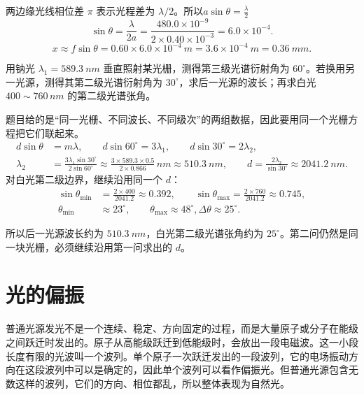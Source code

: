 \documentclass[lang=cn,11pt]{elegantbook}
\begin{document}
\begin{solution}
两边缘光线相位差 \(\pi\) 表示光程差为 \(\lambda/2\)。所以$a\sin\theta=\frac{\lambda}{2}$
\[\sin\theta=\frac{\lambda}{2a} =\frac{480.0\times10^{-9}}{2\times0.40\times10^{-3}} =6.0\times10^{-4}.\]
 \[x\approx f\sin\theta =0.60\times6.0\times10^{-4}\ \si{m} =3.6\times10^{-4}\ \si{m} =\SI{0.36}{mm}.\]
\end{solution}

\begin{exercise}[钠光与另一光源在同一光栅上怎样比较波长]
用钠光 \(\lambda_1=\SI{589.3}{nm}\) 垂直照射某光栅，测得第三级光谱衍射角为 \(60^\circ\)。若换用另一光源，测得其第二级光谱衍射角为 \(30^\circ\)，求后一光源的波长；再求白光 \(400\sim760\,\si{nm}\) 的第二级光谱张角。
\end{exercise}

\begin{solution}
题目给的是“同一光栅、不同波长、不同级次”的两组数据，因此要用同一个光栅方程把它们联起来。
\[
\begin{aligned}
d\sin\theta&=m\lambda,\qquad
d\sin60^\circ=3\lambda_1,\qquad
d\sin30^\circ=2\lambda_2,\\
\lambda_2&=\frac{3\lambda_1\sin30^\circ}{2\sin60^\circ}
\approx \frac{3\times589.3\times0.5}{2\times0.866}\,\si{nm}
\approx \SI{510.3}{nm},\qquad
d=\frac{2\lambda_2}{\sin30^\circ}\approx \SI{2041.2}{nm}.
\end{aligned}
\]
对白光第二级边界，继续沿用同一个 \(d\)：
\[
\begin{aligned}
\sin\theta_{\min}&=\frac{2\times400}{2041.2}\approx0.392,\qquad
\sin\theta_{\max}=\frac{2\times760}{2041.2}\approx0.745,\\
\theta_{\min}&\approx23^\circ,\qquad
\theta_{\max}\approx48^\circ,
\Delta\theta\approx25^\circ.
\end{aligned}
\]

所以后一光源波长约为 \(\SI{510.3}{nm}\)，白光第二级光谱张角约为 \(25^\circ\)。第二问仍然是同一块光栅，必须继续沿用第一问求出的 \(d\)。
\end{solution}



\chapter{光的偏振}

\begin{definition}
普通光源发光不是一个连续、稳定、方向固定的过程，而是大量原子或分子在能级之间跃迁时发出的。原子从高能级跃迁到低能级时，会放出一段电磁波。这一小段长度有限的光波叫一个波列。单个原子一次跃迁发出的一段波列，它的电场振动方向在这段波列中可以是确定的，因此单个波列可以看作偏振光。但普通光源包含无数这样的波列，它们的方向、相位都乱，所以整体表现为自然光。
\end{definition}
\end{document}
